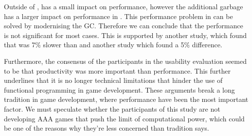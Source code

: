 Outside of \unity, \fs has a small impact on performance, however the additional garbage has a larger impact on performance in \unity. This performance problem in \unity can be solved by modernising the \gls{GC}. Therefore we can conclude that the performance is not significant for most cases. This is supported by another study, which found that \fs was 7\% slower than \cs\cite{bolhuis2019gameplay} and another study which found a 5\% difference\cite{maggiore2012formal}.

Furthermore, the consensus of the participants in the usability evaluation seemed to be that productivity was more important than performance. This further underlines that it is no longer technical limitations that hinder the use of functional programming in game development. These arguments break a long tradition in game development, where performance have been the most important factor. We must speculate whether the participants of this study are not developing AAA games that push the limit of computational power, which could be one of the reasons why they're less concerned than tradition says.

